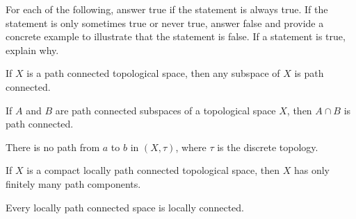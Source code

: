 \begin{comment}
Let $C$ be a nonempty subset of $X$ with $p \in C$. The previous argument shows that $C$ is path connected. 

Now suppose $p \notin C$. Then every subset of $C$ is an open set and the subspace topology on $C$ is the discrete topology. It follows that $C$ is disconnected and is not path connected. 
	
	\ea


\end{comment}


\item For each of the following, answer true if the statement is always true. If the statement is only sometimes true or never true, answer false and provide a concrete example to illustrate that the statement is false. If a statement is true, explain why. 
\ba

\item If $X$ is a path connected topological space, then any subspace of $X$ is path connected. 
	
\item If $A$ and $B$ are path connected subspaces of a topological space $X$, then $A \cap B$ is path connected. 

\item There is no path from $a$ to $b$ in $(X, \tau)$, where $\tau$ is the discrete topology.

\item If $X$ is a compact locally path connected topological space, then $X$ has only finitely many path components. 

\item Every locally path connected space is locally connected. 


	\ea

